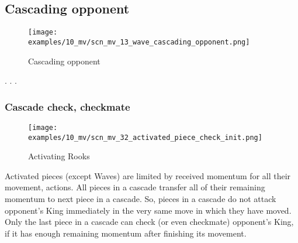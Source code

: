 \subsection*{Cascading opponent}

\vspace*{-1.4\baselineskip}
\noindent
\begin{figure}[h]
\texttt{[image: examples/10\_mv/scn\_mv\_13\_wave\_cascading\_opponent.png]}
\caption{Cascading opponent}
\label{fig:scn_mv_13_wave_cascading_opponent}
\end{figure}

. . .





\clearpage %

\subsubsection*{Cascade check, checkmate}

\vspace*{-1.4\baselineskip}
\noindent
\begin{figure}[!h]
\texttt{[image: examples/10\_mv/scn\_mv\_32\_activated\_piece\_check\_init.png]}
\vspace*{-1.3\baselineskip}
\caption{Activating Rooks}
\label{fig:scn_mv_32_activated_piece_check_init}
\end{figure}

\vspace*{-0.3\baselineskip}
Activated pieces (except Waves) are limited by received momentum for all their movement,
actions. All pieces in a cascade transfer all of their remaining momentum to next piece
in a cascade. So, pieces in a cascade do not attack opponent's King immediately in the
very same move in which they have moved. Only the last piece in a cascade can check (or
even checkmate) opponent's King, if it has enough remaining momentum after finishing its
movement.

